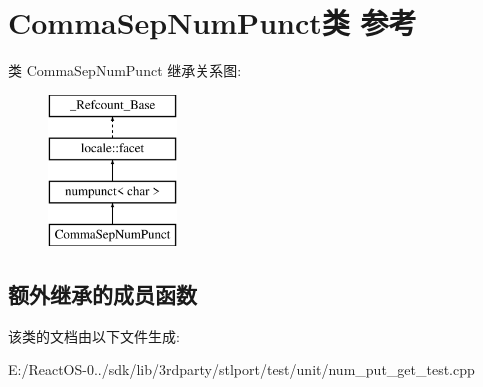 \hypertarget{class_comma_sep_num_punct}{}\section{Comma\+Sep\+Num\+Punct类 参考}
\label{class_comma_sep_num_punct}
类 Comma\+Sep\+Num\+Punct 继承关系图\+:\begin{figure}[H]
\begin{center}
\leavevmode
\includegraphics[height=4.000000cm]{class_comma_sep_num_punct}
\end{center}
\end{figure}
\subsection*{额外继承的成员函数}


该类的文档由以下文件生成\+:\begin{DoxyCompactItemize}
\item 
E\+:/\+React\+O\+S-\/0../sdk/lib/3rdparty/stlport/test/unit/num\+\_\+put\+\_\+get\+\_\+test.\+cpp\end{DoxyCompactItemize}
